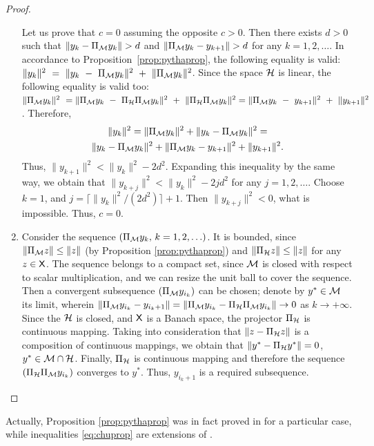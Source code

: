 \documentclass[sii]{ipart}
\begin{document}
\begin{proof}
\begin{enumerate}
		Let us prove that $c = 0$ assuming the opposite $c > 0$. Then there exists $d > 0$ such that $\|y_k - \Pi_{\mathcal{M}} y_k\| > d$ and $\|\Pi_{\mathcal{M}} y_k - y_{k + 1}\| > d$ for any $k = 1, 2, \ldots$. In accordance to Proposition~\ref{prop:pythaprop}, the following equality is valid: $\|y_k \|^2~=~\|y_k~-~\Pi_{\mathcal{M}} y_k\|^2~+~\|\Pi_{\mathcal{M}} y_k \|^2$. Since the space $\mathcal{H}$ is linear, the following equality is valid too:
		$\|\Pi_{\mathcal{M}} y_k \|^2~=\|\Pi_{\mathcal{M}} y_k~-~\Pi_{\mathcal{H}} \Pi_{\mathcal{M}} y_k\|^2~+~\|\Pi_{\mathcal{H}} \Pi_{\mathcal{M}} y_k \|^2 = \|\Pi_{\mathcal{M}} y_k~-~y_{k+1}\|^2~+~\|y_{k+1} \|^2$. Therefore,
		\begin{multline*}
		\|y_k\|^2 = \|\Pi_{\calM} y_k\|^2 + \|y_k - \Pi_{\calM} y_k\|^2 =\\ \|y_k - \Pi_{\calM} y_k\|^2 + \|\Pi_{\calM} y_k - y_{k + 1}\|^2 + \|y_{k + 1}\|^2.
		\end{multline*}
		Thus, $\|y_{k+1}\|^2 < \|y_k\|^2 - 2d^2$. Expanding this inequality by the same way, we obtain that $\|y_{k+j}\|^2 < \|y_k\|^2 - 2 j d^2$ for any $j = 1, 2, \ldots$. Choose $k = 1$, and $j = \lceil \|y_k\|^2 / (2d^2) \rceil + 1$. Then $\|y_{k+j}\|^2 < 0$, what is impossible. Thus, $c=0$.
		\item Consider the sequence $(\Pi_{\mathcal{M}} y_k,\, k = 1, 2, \ldots)$. It is bounded, since $\|\Pi_{\mathcal{M}} z\| \le \|z\|$ (by Proposition \ref{prop:pythaprop}) and $\|\Pi_{\mathcal{H}} z\| \le \|z\|$ for any $z \in \mathsf{X}$. The sequence belongs to a compact set, since $\mathcal{M}$ is closed with respect to scalar multiplication, and we can resize the unit ball to cover the sequence. Then a convergent subsequence $(\Pi_{\mathcal{M}} y_{i_k})$ can be chosen; denote by $y^*\in\mathcal{M}$ its limit, wherein $\|\Pi_{\mathcal{M}} y_{i_k} - y_{i_k + 1}\| = \|\Pi_{\mathcal{M}} y_{i_k} - \Pi_{\mathcal{H}} \Pi_{\mathcal{M}} y_{i_k}\| \to 0$ as $k \to + \infty$. Since the $\mathcal{H}$ is closed, and $\mathsf{X}$ is a Banach space, the projector $\Pi_{\mathcal{H}}$ is continuous mapping. Taking into consideration that $\|z - \Pi_{\mathcal{H}} z\|$ is a composition of continuous mappings, we obtain that $\|y^* - \Pi_{\mathcal{H}} y^*\| = 0$, $y^* \in \mathcal{M} \cap \mathcal{H}$. Finally, $\Pi_{\mathcal{H}}$ is continuous mapping and therefore the sequence $(\Pi_{\mathcal{H}} \Pi_{\mathcal{M}} y_{i_k})$ converges to $y^*$. Thus, $y_{i_k + 1}$ is a required subsequence.
	\end{enumerate}
\end{proof}

Actually, Proposition \ref{prop:pythaprop} was in fact proved in \cite{Gillard.Zhigljavsky2013} for a particular case, while inequalities \eqref{eq:chuprop} are extensions of \cite[inequalities (4.1)]{Chu.etal2003}.
\end{document}
